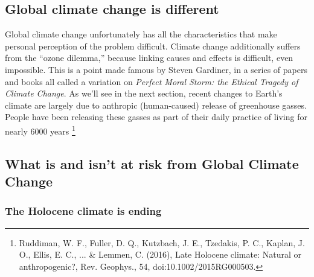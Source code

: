 \documentclass[amstex,12pt]{book}
\begin{document}
\subsection{Global climate change is different}\label{GCC_diff}
Global climate change unfortunately has all the characteristics that make personal perception of the problem difficult. Climate change additionally suffers from the ``ozone dilemma,'' because linking causes and effects is difficult, even impossible. This is a point made famous by Steven Gardiner, in a series of papers and books all called a variation on \emph{Perfect Moral Storm: the Ethical Tragedy of Climate Change}. As we'll see in the next section, recent changes to Earth's climate are largely due to anthropic (human-caused) release of greenhouse gasses. People have been releasing these gasses as part of their daily practice of living for nearly 6000 years \footnote{Ruddiman, W. F., Fuller, D. Q., Kutzbach, J. E., Tzedakis, P. C., Kaplan, J. O., Ellis, E. C., ... \& Lemmen, C. (2016), Late
Holocene climate: Natural or anthropogenic?, Rev. Geophys., 54, doi:10.1002/2015RG000503.}


\subsection{What is and isn't at risk from Global Climate Change}\label{Risk}
\subsubsection{The Holocene climate is ending}
\end{document}
